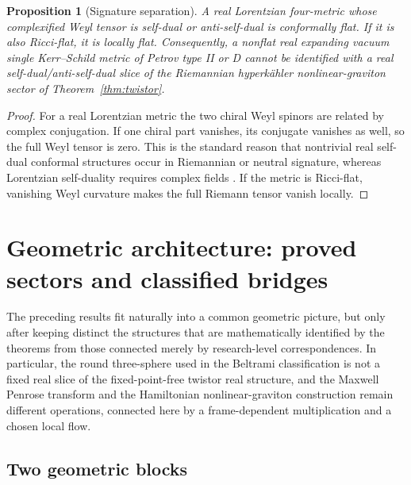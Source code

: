 \documentclass[aps,prd,reprint,nofootinbib,superscriptaddress]{revtex4-2}
\newtheorem{proposition}[theorem]{Proposition}
\theoremstyle{definition}
\theoremstyle{remark}
\begin{document}
\begin{proposition}[Signature separation]
\label{prop:signatureseparation}
A real Lorentzian four-metric whose complexified Weyl tensor is self-dual or anti-self-dual is conformally flat.  If it is also Ricci-flat, it is locally flat.  Consequently, a nonflat real expanding vacuum single Kerr--Schild metric of Petrov type II or D cannot be identified with a real self-dual/anti-self-dual slice of the Riemannian hyperk\"ahler nonlinear-graviton sector of Theorem~\ref{thm:twistor}.
\end{proposition}
\begin{proof}
For a real Lorentzian metric the two chiral Weyl spinors are related by complex conjugation.  If one chiral part vanishes, its conjugate vanishes as well, so the full Weyl tensor is zero.  This is the standard reason that nontrivial real self-dual conformal structures occur in Riemannian or neutral signature, whereas Lorentzian self-duality requires complex fields \cite{AtiyahDunajskiMason2017}.  If the metric is Ricci-flat, vanishing Weyl curvature makes the full Riemann tensor vanish locally.
\end{proof}

\section{Geometric architecture: proved sectors and classified bridges}
\label{sec:interpretation}

The preceding results fit naturally into a common geometric picture, but only after keeping distinct the structures that are mathematically identified by the theorems from those connected merely by research-level correspondences.  In particular, the round three-sphere used in the Beltrami classification is not a fixed real slice of the fixed-point-free twistor real structure, and the Maxwell Penrose transform and the Hamiltonian nonlinear-graviton construction remain different operations, connected here by a frame-dependent multiplication and a chosen local flow.

\subsection{Two geometric blocks}
\end{document}

